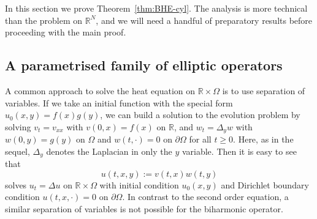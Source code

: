 \documentclass[a4paper, reqno]{amsart}
\numberwithin{equation}{section}
\theoremstyle{plain}
\theoremstyle{definition}
\theoremstyle{remark}
\newcommand{\RR}{\mathbb{R}}
\begin{document}
In this section we prove Theorem~\ref{thm:BHE-cyl}. The analysis is more technical than the problem on $\RR^N$, and we will need a handful of preparatory results before proceeding with the main proof.

\subsection{A parametrised family of elliptic operators}

A common approach to solve the heat equation on $\RR\times\Omega$ is to use separation of variables. If we take an initial function with the special form $u_0(x,y) = f(x)g(y)$, we can build a solution to the evolution problem by solving $v_t = v_{xx}$ with $v(0, x) = f(x)$ on $\RR$, and $w_t = \Delta_y w$ with $w(0, y) = g(y)$ on $\Omega$ and $w(t, \cdot) = 0$ on $\partial\Omega$ for all $t \geq 0$. Here, as in the sequel, $\Delta_y$ denotes the Laplacian in only the $y$ variable. Then it is easy to see that
\begin{equation*}
  u(t,x,y) := v(t,x) w(t, y)
\end{equation*}
solves $u_t = \Delta u$ on $\RR \times \Omega$ with initial condition $u_0(x,y)$ and Dirichlet boundary condition $u(t, x, \cdot) = 0$ on $\partial\Omega$. In contrast to the second order equation, a similar separation of variables is not possible for the biharmonic operator.
\end{document}
